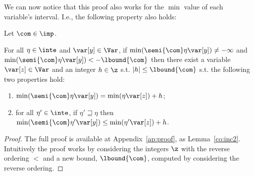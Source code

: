 We can now notice that this proof also works for the \(\min\) value of
each variable's interval. I.e., the following property also holds:

\begin{lemma}\label{co:inc}
  Let \(\com \in \imp\).
  
  \noindent
  For all \(\eta \in \inte\) and
  \(\var[y] \in \Var\), if
  \(\min(\semi{\com}\eta\var[y]) \neq -\infty\) and
  \(\min(\semi{\com}\eta\var[y]) < -\lbound{\com}\) then there exist a
  variable \(\var[z] \in\Var\) and an integer \(h \in \z\) s.t.
  \(|h| \leq \lbound{\com}\) s.t. the following two properties hold:
  
  \begin{enumerate}[label=(\roman*)]
  \item \(\min(\semi{\com}\eta \var[y]) = \min(\eta \var[z]) + h\); \label{point1min}
  \item  for all \(\eta' \in \inte\), if \(\eta' \sqsupseteq \eta\)
    then
    \(\min(\semi{\com}\eta' \var[y]) \leq \min(\eta' \var[z]) + h\). \label{point2min}
  \end{enumerate}
\end{lemma}

\begin{proof}
  The full proof is available at Appendix~\ref{ap:proof}, as
  Lemma~\ref{co:inc2}. Intuitively the proof works by considering the
  integers \(\z\) with the reverse ordering \(<\) and a new bound,
  \(\lbound{\com}\), computed by considering the reverse ordering.
\end{proof}

